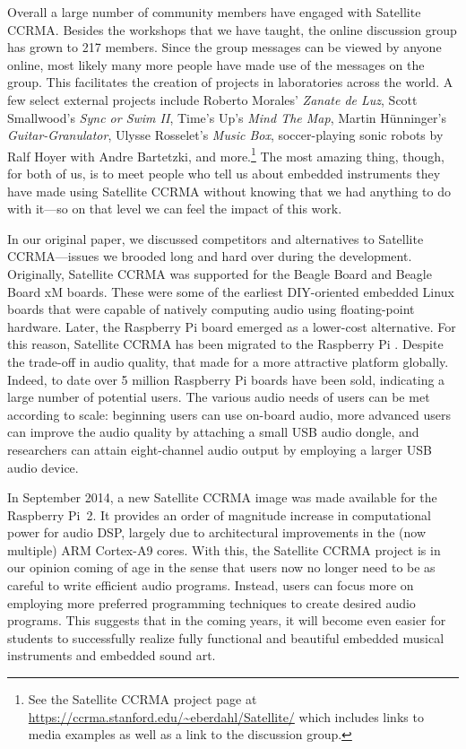 Overall a large number of community members have engaged with
Satellite CCRMA. Besides the workshops that we have taught, the online discussion group has grown to 217 members.
Since the group messages can be viewed by anyone online, most likely many more people have made use of the messages on
the group. This facilitates the creation of projects in laboratories across the world.
A few select external projects include Roberto Morales'
\textit{Zanate de Luz}, Scott Smallwood's \textit{Sync or Swim II}, Time's Up's \textit{Mind The Map}, Martin
Hünninger's \textit{Guitar-Granulator}, Ulysse Rosselet's \textit{Music Box}, soccer-playing sonic robots by Ralf Hoyer
with Andre Bartetzki, and more.\footnote{\textrm{ See the Satellite CCRMA project page at
}\url{https://ccrma.stanford.edu/~eberdahl/Satellite/}\textrm{ which includes links to media examples as well as a link
to the discussion group.}} The most amazing thing, though, for
both of us, is to meet people who tell us about embedded instruments they have made using Satellite CCRMA without
knowing that we had anything to do with it---so on that level we can feel the impact of this work.

In our original paper, we discussed competitors and alternatives to Satellite CCRMA---issues we brooded long and hard
over during the development. Originally, Satellite CCRMA was supported for the Beagle Board and Beagle Board xM boards.
These were some of the earliest DIY-oriented embedded Linux boards that were capable of natively computing audio using
floating-point hardware. Later, the Raspberry Pi board emerged as a lower-cost alternative. For this reason, Satellite
CCRMA has been migrated to the Raspberry Pi \cite{Berdahl:2013}. Despite the trade-off in audio quality, that made for a more
attractive platform globally. Indeed, to date over 5 million Raspberry Pi boards have been sold, indicating a large
number of potential users. The various audio needs of users can be met according to scale: beginning users can use
on-board audio, more advanced users can improve the audio quality by attaching a small USB audio dongle, and
researchers can attain eight-channel audio output by employing a larger USB audio device.

In September 2014, a new Satellite CCRMA image was made available for the Raspberry Pi~2. It provides an order of
magnitude increase in computational power for audio DSP, largely due to architectural improvements in the (now
multiple) ARM Cortex-A9 cores. With this, the Satellite CCRMA project is in our opinion coming of age in the sense that
users now no longer need to be as careful to write efficient audio programs. Instead, users can focus more on employing
more preferred programming techniques to create desired audio programs. This suggests that in the coming years, it will
become even easier for students to successfully realize fully functional and beautiful embedded musical instruments and
embedded sound art.

